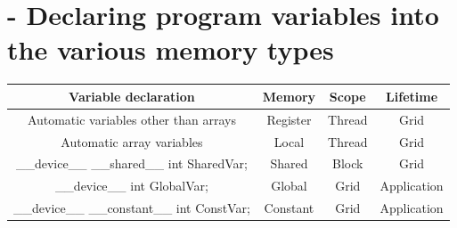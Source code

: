 \section{- Declaring program variables into the various memory types}
\begin{center}
    \begin{tabular}{c|c|c|c}
        Variable declaration                          & Memory   & Scope  & Lifetime    \\
        \hline
        Automatic variables other than arrays         & Register & Thread & Grid        \\
        Automatic array variables                     & Local    & Thread & Grid        \\
        \_\_device\_\_ \_\_shared\_\_ int SharedVar;  & Shared   & Block  & Grid        \\
        \_\_device\_\_ int GlobalVar;                 & Global   & Grid   & Application \\
        \_\_device\_\_ \_\_constant\_\_ int ConstVar; & Constant & Grid   & Application \\
    \end{tabular}
\end{center}
